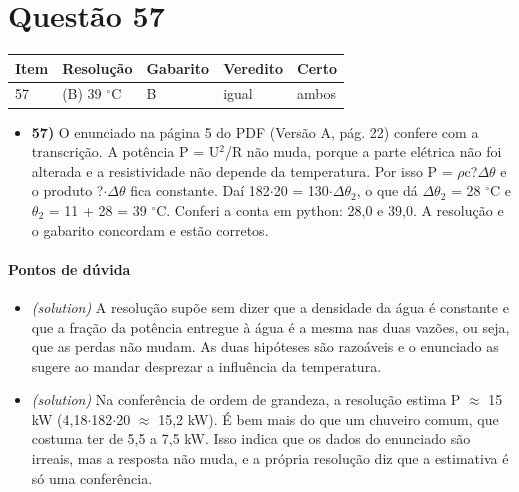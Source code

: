 \documentclass{article}%
\begin{document}
\section*{Questão 57}%
\begin{longtable}{@{}p{} p{} p{} p{} p{}@{}}\toprule Item & Resolução & Gabarito & Veredito & Certo \\ \midrule
57 & (B) 39 $^\circ$C & B & igual & ambos \\
\bottomrule\end{longtable}%
\begin{itemize}%
\item%
\textbf{57)} O enunciado na página 5 do PDF (Versão A, pág. 22) confere com a transcrição. A potência P = U$^2$/R não muda, porque a parte elétrica não foi alterada e a resistividade não depende da temperatura. Por isso P = $\rho$c?$\Delta$$\theta$ e o produto ?$\cdot$$\Delta$$\theta$ fica constante. Daí 182$\cdot$20 = 130$\cdot$$\Delta$$\theta$$_{2}$, o que dá $\Delta$$\theta$$_{2}$ = 28 $^\circ$C e $\theta$$_{2}$ = 11 + 28 = 39 $^\circ$C. Conferi a conta em python: 28,0 e 39,0. A resolução e o gabarito concordam e estão corretos.%
\end{itemize}%
\paragraph{Pontos de dúvida}%
\begin{itemize}%
\item%
\textit{(solution)} A resolução supõe sem dizer que a densidade da água é constante e que a fração da potência entregue à água é a mesma nas duas vazões, ou seja, que as perdas não mudam. As duas hipóteses são razoáveis e o enunciado as sugere ao mandar desprezar a influência da temperatura.%
\item%
\textit{(solution)} Na conferência de ordem de grandeza, a resolução estima P $\approx$ 15 kW (4,18$\cdot$182$\cdot$20 $\approx$ 15,2 kW). É bem mais do que um chuveiro comum, que costuma ter de 5,5 a 7,5 kW. Isso indica que os dados do enunciado são irreais, mas a resposta não muda, e a própria resolução diz que a estimativa é só uma conferência.%
\end{itemize}%
\end{document}
